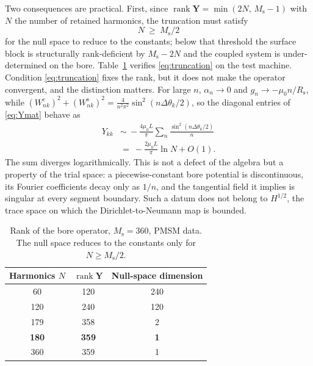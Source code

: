 \documentclass[10pt,a4paper,twocolumn]{article}
\newcommand{\Rs}{R_{\mathrm{s}}}
\theoremstyle{plain}
\theoremstyle{remark}
\begin{document}
Two consequences are practical. First, since
$\operatorname{rank}\bm{Y} = \min(2N,\,M_{\mathrm{s}}-1)$ with $N$ the
number of retained harmonics, the truncation must satisfy
\begin{equation}
N \ \ge\ M_{\mathrm{s}}/2
\label{eq:truncation}
\end{equation}
for the null space to reduce to the constants; below that threshold the
surface block is structurally rank-deficient by $M_{\mathrm{s}}-2N$ and
the coupled system is under-determined on the bore.
Table~\ref{tab:rank} verifies \eqref{eq:truncation} on the test machine.
Condition \eqref{eq:truncation} fixes the rank, but it does not make the
operator convergent, and the distinction matters. For large $n$,
$\alpha_n\to0$ and $g_n\to-\mu_0 n/\Rs$, while
$(W^{\mathrm{c}}_{nk})^2+(W^{\mathrm{s}}_{nk})^2
=\tfrac{4}{n^2\pi^2}\sin^2(n\Delta\theta_k/2)$, so the diagonal entries
of \eqref{eq:Ymat} behave as
\begin{equation}
\begin{aligned}
Y_{kk} &\sim\ -\frac{4\mu_0 L}{\pi}
\sum_n \frac{\sin^2(n\Delta\theta_k/2)}{n}\\[0.5ex]
&=\ -\frac{2\mu_0 L}{\pi}\ln N + O(1).
\end{aligned}
\label{eq:logtail}
\end{equation}
The sum diverges logarithmically. This is not a defect of the algebra
but a property of the trial space: a piecewise-constant bore potential
is discontinuous, its Fourier coefficients decay only as $1/n$, and the
tangential field it implies is singular at every segment boundary. Such
a datum does not belong to $H^{1/2}$, the trace space on which the
Dirichlet-to-Neumann map is bounded.

\begin{table}[!ht]
\centering
\footnotesize
\begin{tabular}{ccc}
\toprule
Harmonics $N$ & $\operatorname{rank}\bm{Y}$ & Null-space dimension \\
\midrule
60  & 120 & 240 \\
120 & 240 & 120 \\
179 & 358 & 2   \\
\textbf{180} & \textbf{359} & \textbf{1} \\
360 & 359 & 1   \\
\bottomrule
\end{tabular}
\caption{Rank of the bore operator, $M_{\mathrm{s}}=360$, PMSM data. The
null space reduces to the constants only for $N\ge M_{\mathrm{s}}/2$.}
\label{tab:rank}
\end{table}
\end{document}
